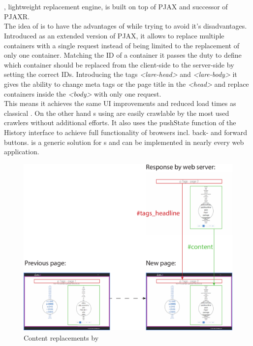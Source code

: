 \section{\lare{}\label{chap:lare}}
\lare{}, lightweight \ajax{} replacement engine, is built on top of PJAX and successor of PJAXR.
\\
The idea of \lare{} is to have the advantages of \ajax{} while trying to avoid it's disadvantages.
Introduced as an extended version of PJAX, it allows to replace multiple containers with a single request instead of being limited to the replacement of only one container.
Matching the ID of a container it passes the duty to define which container should be replaced from the client-side to the server-side by setting the correct IDs.
Introducing the tags \emph{<lare-head>} and \emph{<lare-body>} it gives the ability to change meta tags or the page title in the \emph{<head>} and replace containers inside the \emph{<body>} with only one request.
\\
This means it achieves the same UI improvements and reduced load times as classical \ajax{}.
On the other hand \singlePageApplication{}s using \lare{} are easily crawlable by the most used crawlers without additional efforts.
It also uses the pushState function of the History interface to achieve full functionality of browsers incl. back- and forward buttons.
\lare{} is a generic solution for \singlePageApplication{}s and can be implemented in nearly every web application.

\begin{figure}[H]
\centering
\includegraphics[height=9cm]{images/lare_replacements.pdf}
\caption[lare_replacements]{Content replacements by \lare{}}
\label{fig:lare_replacements}
\end{figure}

